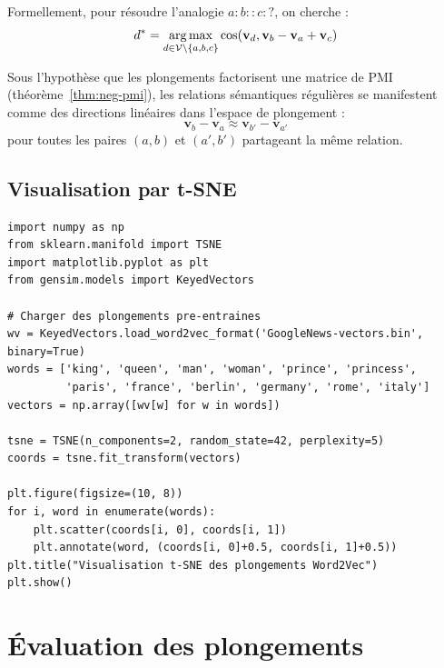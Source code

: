 Formellement, pour r\'esoudre l'analogie $a : b :: c : ?$, on cherche :
\[
d^* = \operatorname*{arg\,max}_{d \in \mathcal{V} \setminus \{a,b,c\}} \cos(\mathbf{v}_d, \mathbf{v}_b - \mathbf{v}_a + \mathbf{v}_c)
\]

\begin{theoreme}
Sous l'hypoth\`ese que les plongements factorisent une matrice de PMI
(th\'eor\`eme~\ref{thm:neg-pmi}), les relations s\'emantiques r\'eguli\`eres
se manifestent comme des directions lin\'eaires dans l'espace de plongement :
\[
\mathbf{v}_b - \mathbf{v}_a \approx \mathbf{v}_{b'} - \mathbf{v}_{a'}
\]
pour toutes les paires $(a, b)$ et $(a', b')$ partageant la m\^eme relation.
\end{theoreme}

\subsection{Visualisation par t-SNE}

\begin{codeblock}[title=\textbf{Visualisation des plongements}]
\begin{verbatim}
import numpy as np
from sklearn.manifold import TSNE
import matplotlib.pyplot as plt
from gensim.models import KeyedVectors

# Charger des plongements pre-entraines
wv = KeyedVectors.load_word2vec_format('GoogleNews-vectors.bin', binary=True)
words = ['king', 'queen', 'man', 'woman', 'prince', 'princess',
         'paris', 'france', 'berlin', 'germany', 'rome', 'italy']
vectors = np.array([wv[w] for w in words])

tsne = TSNE(n_components=2, random_state=42, perplexity=5)
coords = tsne.fit_transform(vectors)

plt.figure(figsize=(10, 8))
for i, word in enumerate(words):
    plt.scatter(coords[i, 0], coords[i, 1])
    plt.annotate(word, (coords[i, 0]+0.5, coords[i, 1]+0.5))
plt.title("Visualisation t-SNE des plongements Word2Vec")
plt.show()
\end{verbatim}
\end{codeblock}

\section{\'Evaluation des plongements}
\label{sec:plg:evaluation}

